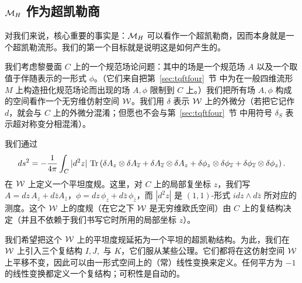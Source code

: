 
\subsection{${{\mathcal{M}}}_H$ 作为超凯勒商}

\label{sec:mhhyper}

对我们来说，核心重要的事实是：${{\mathcal{M}}}_H$ 可以看作一个超凯勒商，因而本身就是一个超凯勒流形。我们的第一个目标就是说明这是如何产生的。

我们考虑黎曼面 $C$ 上的一个规范场论问题：其中的场是一个规范场 $ A$ 以及一个取值于伴随表示的一形式 $\phi$。（它们来自把第~\ref{sec:tqftfour}~节 中为在一般四维流形 $M$ 上构造扭化规范场论而出现的场 $A,\phi$ 限制到 $C$ 上。）我们把所有场 $A,\phi$ 构成的空间看作一个无穷维仿射空间 ${\mathcal{W}}$。我们用 $\delta$ 表示 ${\mathcal{W}}$ 上的外微分（若把它记作 $d$，就会与 $C$ 上的外微分混淆；但愿也不会与第~\ref{sec:tqftfour}~节 中用符号 $\delta_S$ 表示超对称变分相混淆）。

我们通过%
\setcounter{equation}{1}
\begin{equation}\label{eq:igob}
ds^2=-{1\over
4\pi}\int_C|d^2z|\,\operatorname{Tr}\left(\delta A_z\otimes \delta A_{\overline
z}+\delta A_{\overline z}\otimes \delta A_z +\delta \phi_z\otimes
\delta \phi_{\overline z}+\delta \phi_{\overline z}\otimes \delta
\phi_z\right).
\end{equation}在 ${\mathcal{W}}$ 上定义一个平坦度规。这里，对 $C$ 上的局部复坐标 $z$，我们写 $A=dz\,A_z+d\bar z A_{\bar z}$，$\phi = dz\,\phi_z+d\bar z\,\phi_{\bar z}$，而 $|d^2z|$ 是 $(1,1)$-形式 $i dz\wedge d\bar z$ 所对应的测度。这个 ${\mathcal{W}}$ 上的度规（在它之下 ${\mathcal{W}}$ 是无穷维欧氏空间）由 $C$ 上的复结构决定（并且不依赖于我们书写它时所用的局部坐标 $z$）。

我们希望把这个 ${\mathcal{W}}$ 上的平坦度规延拓为一个平坦的超凯勒结构。为此，我们在 ${\mathcal{W}}$ 上引入三个复结构 $I,J,$ 与 $K$，它们服从某些公理。它们都将在这仿射空间 ${\mathcal{W}}$ 上平移不变，因此可以由一形式空间上的（常）线性变换来定义。任何平方为 $-1$ 的线性变换都定义一个复结构；可积性是自动的。

